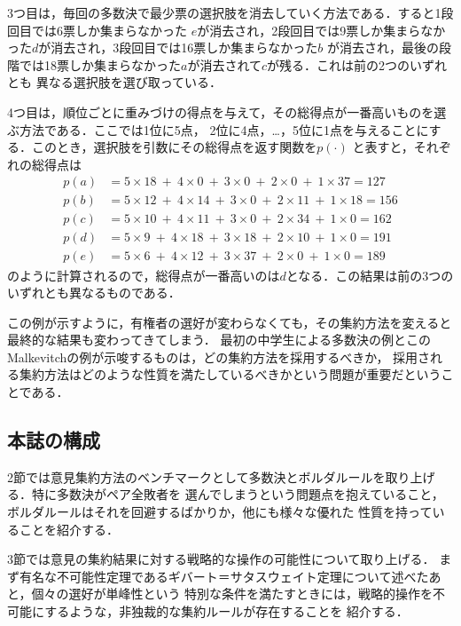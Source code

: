 \documentclass[dvipdfmx]{jsarticle}
\begin{document}
3つ目は，毎回の多数決で最少票の選択肢を消去していく方法である．すると1段回目では6票しか集まらなかった
$e$が消去され，2段回目では9票しか集まらなかった$d$が消去され，3段回目では16票しか集まらなかった$b$
が消去され，最後の段階では18票しか集まらなかった$a$が消去されて$c$が残る．これは前の2つのいずれとも
異なる選択肢を選び取っている．

4つ目は，順位ごとに重みづけの得点を与えて，その総得点が一番高いものを選ぶ方法である．ここでは1位に5点，
2位に4点，\ldots，5位に1点を与えることにする．このとき，選択肢を引数にその総得点を返す関数を$p(\cdot)$
と表すと，それぞれの総得点は
\begin{align*}
  p(a) &= 5 \times 18 \ +\  4 \times 0 \ +\ 3 \times 0 \ +\  2 \times 0\ +\ 1 \times 37 = 127 \\
  p(b) &= 5 \times 12 \ +\  4 \times 14 \ +\ 3 \times 0 \ +\  2 \times 11 \ +\ 1 \times 18 = 156 \\
  p(c) &= 5 \times 10 \ +\  4 \times 11 \ +\ 3 \times 0 \ +\  2 \times 34 \ +\ 1 \times 0 = 162 \\
  p(d) &= 5 \times 9 \ +\  4 \times 18 \ +\ 3 \times 18 \ +\  2 \times 10 \ +\ 1 \times 0 = 191 \\
  p(e) &= 5 \times 6 \ +\  4 \times 12 \ +\ 3 \times 37 \ +\  2 \times 0 \ +\ 1 \times 0 = 189
\end{align*}
のように計算されるので，総得点が一番高いのは$d$となる．この結果は前の3つのいずれとも異なるものである．

この例が示すように，有権者の選好が変わらなくても，その集約方法を変えると最終的な結果も変わってきてしまう．
最初の中学生による多数決の例とこのMalkevitchの例が示唆するものは，どの集約方法を採用するべきか，
採用される集約方法はどのような性質を満たしているべきかという問題が重要だということである．

\subsection{本誌の構成}
2節では意見集約方法のベンチマークとして多数決とボルダルールを取り上げる．特に多数決がペア全敗者を
選んでしまうという問題点を抱えていること，ボルダルールはそれを回避するばかりか，他にも様々な優れた
性質を持っていることを紹介する．

3節では意見の集約結果に対する戦略的な操作の可能性について取り上げる．
まず有名な不可能性定理であるギバート＝サタスウェイト定理について述べたあと，個々の選好が単峰性という
特別な条件を満たすときには，戦略的操作を不可能にするような，非独裁的な集約ルールが存在することを
紹介する．
\end{document}
